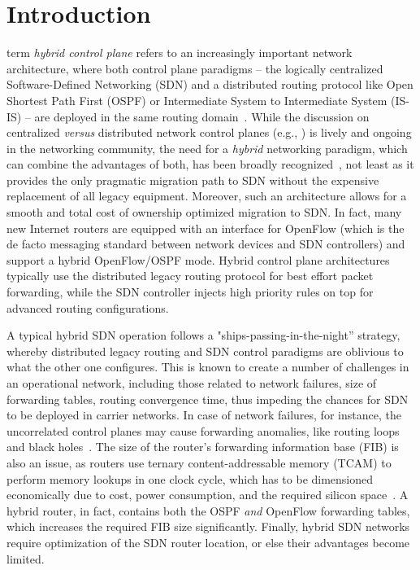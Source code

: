 \documentclass[journal]{IEEEtran}
\begin{document}
\section{Introduction}
 term \emph{hybrid control plane} refers to an increasingly important network architecture, where both control plane paradigms -- the logically centralized Software-Defined Networking (SDN) and a distributed routing protocol like Open Shortest Path First (OSPF) or Intermediate System to Intermediate System (IS-IS) -- are deployed in the same routing domain~\cite{brocade, picos}. While the discussion on centralized \emph{versus} distributed network control planes (e.g., \cite{Pepelnjak, Dixon}) is lively and ongoing in the networking community, the need for a \emph{hybrid} networking paradigm, which can combine the advantages of both, has been broadly recognized~\cite{hybrid_1, hybrid_2, hybrid_3, hybrid_4, Brockners, Vissicchio2}, not least as it provides the only pragmatic migration path to SDN without the expensive replacement of all legacy equipment. Moreover, such an architecture allows for a smooth and total cost of ownership optimized migration to SDN. In fact, many new Internet routers are equipped with an interface for OpenFlow (which is the de facto messaging standard between network devices and SDN controllers) and support a hybrid OpenFlow/OSPF mode. Hybrid control plane architectures typically use the distributed legacy routing protocol for best effort packet forwarding, while the SDN controller injects high priority rules on top for advanced routing configurations.

\par A typical hybrid SDN operation follows a "ships-passing-in-the-night'' strategy, whereby distributed legacy routing and SDN control paradigms are oblivious to what the other one configures. This is known to create a number of challenges in an operational network, including those related to network failures, size of forwarding tables, routing convergence time, thus impeding the chances for SDN to be deployed in carrier networks. In case of network failures, for instance, the uncorrelated control planes may cause forwarding anomalies, like routing loops and black holes~\cite{Vissicchio2}. The size of the router's forwarding information base (FIB) is also an issue, as routers use ternary content-addressable memory (TCAM) to perform memory lookups in one clock cycle, which has to be dimensioned economically due to cost, power consumption, and the required silicon space~\cite{tcam}. A hybrid router, in fact, contains both the OSPF \emph{and} OpenFlow forwarding tables, which increases the required FIB size significantly. Finally, hybrid SDN networks require optimization of the SDN router location, or else their advantages become limited.
\end{document}
